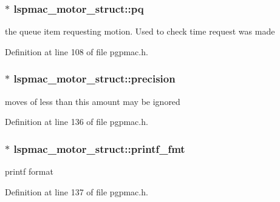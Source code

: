 \hypertarget{structlspmac__motor__struct_a8caf0031e134e144bffc87d9d896d15b}{
\subsubsection[{pq}]{$\ast$ lspmac\-\_\-motor\-\_\-struct\-::pq}}\label{structlspmac__motor__struct_a8caf0031e134e144bffc87d9d896d15b}


the queue item requesting motion. Used to check time request was made 



Definition at line 108 of file pgpmac.\-h.

\hypertarget{structlspmac__motor__struct_a411f12c0ecdc481687d4fbbbec4c5510}{
\subsubsection[{precision}]{$\ast$ lspmac\-\_\-motor\-\_\-struct\-::precision}}\label{structlspmac__motor__struct_a411f12c0ecdc481687d4fbbbec4c5510}


moves of less than this amount may be ignored 



Definition at line 136 of file pgpmac.\-h.

\hypertarget{structlspmac__motor__struct_a25b13b65baf1b28c34012850809b0a3a}{
\subsubsection[{printf\-\_\-fmt}]{$\ast$ lspmac\-\_\-motor\-\_\-struct\-::printf\-\_\-fmt}}\label{structlspmac__motor__struct_a25b13b65baf1b28c34012850809b0a3a}


printf format 



Definition at line 137 of file pgpmac.\-h.

